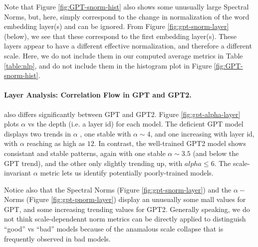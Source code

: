 Note that Figure \ref{fig:GPT-snorm-hist} also shows some unusually large Spectral Norms, but,
here, simply correspond to the change in normalization of the word embedding layer(s) and can be ignored.
From Figure \ref{fig:gpt-snorm-layer} (below), we see that these correspond to the first embedding layer(s).
These layers appear to have a different effective normalization, and therefore a different scale.
Here, we do not include them in our computed average metrics in Table \ref{table:nlp},
and do not include them in the histogram plot in Figure \ref{fig:GPT-snorm-hist}.

\paragraph{Layer Analysis: Correlation Flow in GPT and GPT2.} 

also differs significantly between GPT and GPT2.
Figure \ref{fig:gpt-alpha-layer} plots $\alpha$ vs the depth (i.e. a layer id) for each model.
The deficient GPT model displays two trends in $\alpha$ , one stable with $\alpha\sim 4$,
and one increasing with layer id, with $\alpha$ reaching as high as $12$.
In contrast, the well-trained GPT2 model shows consistant and stable patterns, again
with one stable $\alpha\sim 3.5$ (and below the GPT trend), and the other only
slightly trending up, with $alpha\le 6$. 
The scale-invariant $\alpha$ metric lets us identify potentially
poorly-trained models.

Notice also that the Spectral Norms
(Figure \ref{fig:gpt-snorm-layer})
and the $\alpha-$Norms
(Figure \ref{fig:gpt-pnorm-layer})
display an unusually some mall values for GPT,
and some increasing trending values for GPT2.
Generally speaking, we do not think scale-dependennt 
norm metrics can be directly applied to distinguish ``good'' vs ``bad'' models 
because of the anamalous scale collapse that is frequently observed in bad models.

